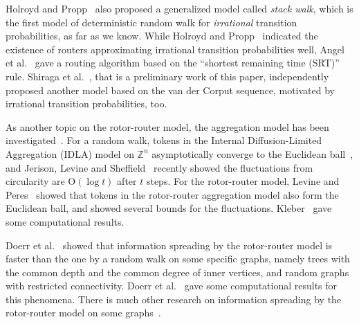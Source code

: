 \documentclass[letter, 11pt]{article}
\newcommand{\Order}{\mathrm{O}}
\newcommand{\1}{\mbox{1}\hspace{-0.25em}\mbox{l}}
\begin{document}
Holroyd and Propp~\cite{HP10} also proposed a generalized model called {\em stack walk}, 
   which is the first model of deterministic random walk for {\em irrational} transition probabilities, as far as we know. 
While Holroyd and Propp~\cite{HP10} indicated the existence of routers 
   approximating irrational transition probabilities well, 
 Angel et al.~\cite{AJJ10} gave a routing algorithm based on the ``shortest remaining time (SRT)'' rule. 
Shiraga et al.~\cite{shiraga}, that is a preliminary work of this paper, 
  independently proposed another model based on the van der Corput sequence, 
  motivated by irrational transition probabilities, too. 

As another topic on the rotor-router model, 
  the aggregation model has been investigated~\cite{LP05, Kleber05, LP08, LP09}. 
 For a random walk, 
  tokens in the Internal Diffusion-Limited Aggregation (IDLA) model on $\mathbb{Z}^n$ 
   asymptotically converge to the Euclidean ball~\cite{LBG92}, and  
 Jerison, Levine and Sheffield~\cite{JLS12} recently showed  
  the fluctuations from circularity are $\Order(\log t)$ after $t$ steps.
 For the rotor-router model, 
  Levine and Peres~\cite{LP05, LP08, LP09} showed that 
  tokens in the rotor-router aggregation model also form the Euclidean ball, and  
  showed several bounds for the fluctuations. 
Kleber~\cite{Kleber05} gave some computational results. 

Doerr et al.~\cite{DFS08} showed that 
  information spreading by the rotor-router model is faster than the one by a random walk 
 on some specific graphs, 
  namely trees with the common depth and the common degree of inner vertices, and 
  random graphs with restricted connectivity.  
 Doerr et al.~\cite{DFKS09} 
   gave some computational results for this phenomena. 
 There is much other research on information spreading 
  by the rotor-router model on some graphs~\cite{ADHP09, Doerr09, DFS09a, DFS09b, DHL09, HF09}.
\end{document}
